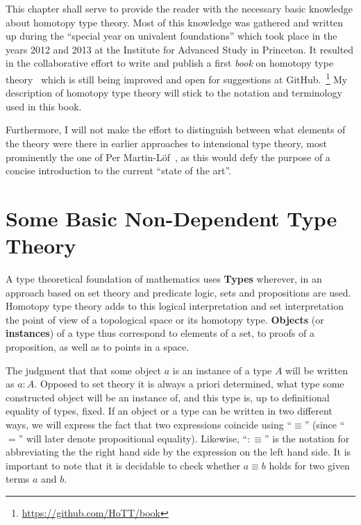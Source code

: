 This chapter shall serve to provide the reader with the necessary basic knowledge
about homotopy type theory.
Most of this knowledge was gathered and written up during the ``special year 
on univalent foundations'' which took place in the years 2012 and 2013
at the Institute for Advanced Study in Princeton.
It resulted in the collaborative effort to write and publish a first \emph{book}
on homotopy type theory~\cite{hottbook} which is still being improved and open
for suggestions at GitHub.~\footnote{\url{https://github.com/HoTT/book}}
My description of homotopy type theory will stick to the notation and terminology
used in this book.

Furthermore, I will not make the effort to distinguish between what elements of
the theory were there in earlier approaches to intensional type theory,
most prominently the one of Per Martin-L\"of~\cite{martin-lof1}, as this would
defy the purpose of a concise introduction to the current ``state of the art''.

\section{Some Basic Non-Dependent Type Theory}

A type theoretical foundation of mathematics uses \textbf{Types} wherever,
in an approach based on set theory and predicate logic, sets and propositions
are used.
Homotopy type theory adds to this logical interpretation and set interpretation
the point of view of a topological space or its homotopy type.
\textbf{Objects} (or \textbf{instances}) of a type thus correspond to elements of
a set, to proofs of a proposition, as well as to points in a space.

The judgment that that some object $a$ is an instance of a type $A$ will be written
as $a : A$.
Opposed to set theory it is always a priori determined, what type some constructed
object will be an instance of, and this type is, up to definitional equality of
types, fixed.
If an object or a type can be written in two different ways, we will express the
fact that two expressions coincide using ``$\equiv$'' (since ``$=$'' will later
denote propositional equality).
Likewise, ``$:\equiv$'' is the notation for abbreviating the the right hand side
by the expression on the left hand side.
It is important to note that it is decidable to check whether $a \equiv b$ holds
for two given terms $a$ and $b$.

